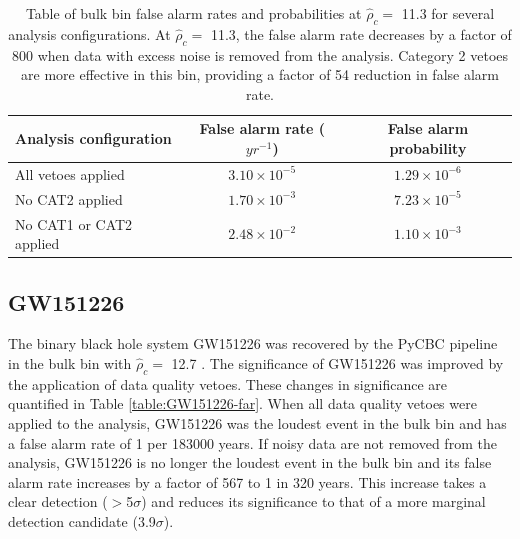 \begin{table}[!ht]%
  \begin{center}
    \begin{tabular}{lcc}
      \hline
      Analysis configuration & False alarm rate ($yr^{-1}$) & False alarm probability \\ \hline
      All vetoes applied & $3.10\times10^{-5}$  & $1.29\times10^{-6}$ \\
      No CAT2 applied & $1.70\times10^{-3}$ & $7.23\times10^{-5}$ \\
      No CAT1 or CAT2 applied & $2.48\times10^{-2}$ & $1.10\times10^{-3}$ \\ \hline
    \end{tabular}
  \end{center}
  \caption[Bulk bin FAR - GW151226 analysis]{Table of bulk bin false alarm rates and probabilities at $\hat{\rho}_{c} =$ 11.3 %
           for several analysis configurations. At $\hat{\rho}_{c} =$ 11.3, the false alarm %
           rate decreases by a factor of 800 when data with excess noise is removed from %
           the analysis. Category 2 vetoes are more effective in this bin, providing a factor %
           of 54 reduction in false alarm rate.}
  \label{table:GW151226-bulk-far}
\end{table}

\subsection{GW151226}\label{sec:GW151226}

The binary black hole system GW151226 was recovered by the PyCBC pipeline
in the bulk bin with $\hat{\rho}_{c} =$ 12.7 \cite{GW151226}.
The significance of GW151226 was improved by the application of data quality
vetoes. These changes in significance are quantified in Table \ref{table:GW151226-far}.
When all data quality vetoes were applied to the analysis, GW151226 was the loudest
event in the bulk bin and has a false alarm rate of 1 per 183000 years.
If noisy data are not removed from the analysis, GW151226 is no longer the loudest
event in the bulk bin and its false alarm rate increases by a factor of 567
to 1 in 320 years. This
increase takes a clear detection ($>$5$\sigma$) and reduces its significance to
that of a more marginal detection candidate (3.9$\sigma$).

